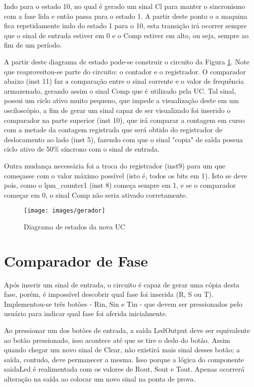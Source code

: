 \documentclass[12pt,a4paper,openany]{abntex2}
\begin{document}
Indo para o estado 10, no qual é gerado um sinal Cl para manter o sincronismo com a fase lida e então passa para o estado 1. A partir deste ponto o a maquina fica repetidamente indo do estado 1 para o 10, esta transição irá ocorrer sempre que o sinal de entrada estiver em 0 e o Comp estiver em alto, ou seja, sempre ao fim de um período.

A partir deste diagrama de estado pode-se construir o circuito da Figura \ref{fig:gerador}. Note que reaproveitou-se parte do circuito: o contador e o registrador. O comparador abaixo (inst 11) faz a comparação entre o sinal corrente e o valor de frequência armazenado, gerando assim o sinal Comp que é utilizado pela UC. Tal sinal, possui um ciclo ativo muito pequeno, que impede a visualização deste em um osciloscópio, a fim de gerar um sinal capaz de ser visualizado foi inserido o comparador na parte superior (inst 10), que irá comparar a contagem em curso com a metade da contagem registrada que será obtido do registrador de deslocamento ao lado (inst 5), fazendo com que o sinal "copia" de saída possua ciclo ativo de 50\% síncrono com o sinal de entrada.

Outra mudança necessária foi a troca do registrador (inst9) para um que começasse com o valor máximo possível (isto é, todos os bits em 1). Isto se deve pois, como o lpm\_counter1 (inst 8) começa sempre em 1, e se o comparador começar em 0, o sinal Comp não seria ativado corretamente.

\begin{figure}[!htp]
	\centering
	\caption{Diagrama de estados da nova UC}
	\texttt{[image: images/gerador]}
	\label{fig:gerador}
\end{figure}

\section{Comparador de Fase}

Após inserir um sinal de entrada, o circuito é capaz de gerar uma cópia desta fase, porém, é impossível descobrir qual fase foi inserida (R, S ou T). Implementou-se três botões - Rin, Sin e Tin - que devem ser pressionados pelo usuário para indicar qual fase foi aferida inicialmente.

Ao pressionar um dos botões de entrada, a saída LedOutput deve ser equivalente ao botão pressionado, isso acontece até que se tire o dedo do botão. Assim quando chegar um novo sinal de Clear, não existirá mais sinal desses botão; a saída, contudo, deve permanecer a mesma. Isso porque a lógica do componente saidaLed é realimentada com os valores de Rout, Sout e Tout. Apenas ocorrerá alteração na saída ao colocar um novo sinal na ponta de prova.
\end{document}
